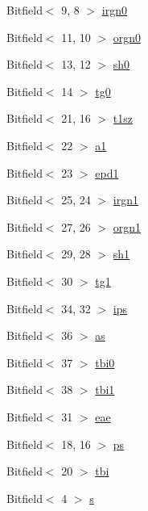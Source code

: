 \begin{DoxyCompactItemize}
\item 
Bitfield$<$ 9, 8 $>$ \hyperlink{namespaceArmISA_a6ecbc132b2fac0a86553f2ff4f5c8354}{irgn0}
\item 
Bitfield$<$ 11, 10 $>$ \hyperlink{namespaceArmISA_a0c7da531f75d52b7f74c1be573470373}{orgn0}
\item 
Bitfield$<$ 13, 12 $>$ \hyperlink{namespaceArmISA_a32b288cfebd4acb24273024d00461cbf}{sh0}
\item 
Bitfield$<$ 14 $>$ \hyperlink{namespaceArmISA_a62402de4974f036d24c59c253adbf809}{tg0}
\item 
Bitfield$<$ 21, 16 $>$ \hyperlink{namespaceArmISA_ac45942b25001cdea5c83be99dc99ae40}{t1sz}
\item 
Bitfield$<$ 22 $>$ \hyperlink{namespaceArmISA_a02fd45c801373beaf5118b400037a8f8}{a1}
\item 
Bitfield$<$ 23 $>$ \hyperlink{namespaceArmISA_a80e24cef2497c9d0288ceba6c9e392ba}{epd1}
\item 
Bitfield$<$ 25, 24 $>$ \hyperlink{namespaceArmISA_a91f41e456cd8193efdfdb4f598affcd4}{irgn1}
\item 
Bitfield$<$ 27, 26 $>$ \hyperlink{namespaceArmISA_aa06db08df8cd3a93d5b3e9e5db1eb30f}{orgn1}
\item 
Bitfield$<$ 29, 28 $>$ \hyperlink{namespaceArmISA_a09db0edd59303805647c976d44b94f6e}{sh1}
\item 
Bitfield$<$ 30 $>$ \hyperlink{namespaceArmISA_a83944b9c7b0fef03daf3a2c1b86bdd5f}{tg1}
\item 
Bitfield$<$ 34, 32 $>$ \hyperlink{namespaceArmISA_a34f49925d62898ff57b3c0517eb90b7f}{ips}
\item 
Bitfield$<$ 36 $>$ \hyperlink{namespaceArmISA_a83f0b15889476b577ea2a49b1f6b536e}{as}
\item 
Bitfield$<$ 37 $>$ \hyperlink{namespaceArmISA_aa4515893aa52c8b7e9235cab3997627a}{tbi0}
\item 
Bitfield$<$ 38 $>$ \hyperlink{namespaceArmISA_a15fc00c7033df3a8e357803c8d20842e}{tbi1}
\item 
Bitfield$<$ 31 $>$ \hyperlink{namespaceArmISA_a6ded78ee86c7b78f064b7131923d4c5a}{eae}
\item 
Bitfield$<$ 18, 16 $>$ \hyperlink{namespaceArmISA_a605ede8bf0f2ccf5b3928adf311a964a}{ps}
\item 
Bitfield$<$ 20 $>$ \hyperlink{namespaceArmISA_a158d86e23b581019d51b398a00495692}{tbi}
\item 
Bitfield$<$ 4 $>$ \hyperlink{namespaceArmISA_afaeb18e17f862d8fcb76dfb68a18854f}{s}
\item 

\end{DoxyCompactItemize}
